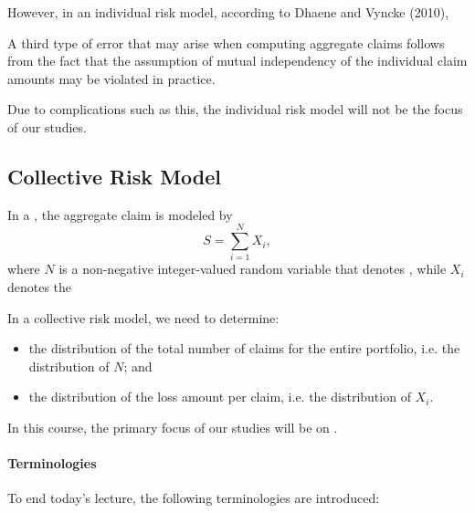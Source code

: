 \documentclass[notoc,notitlepage]{tufte-book}
\begin{document}
However, in an individual risk model, according to Dhaene and Vyncke (2010)\cite{DhaeneVyncke2010},

\begin{displayquote}
  A third type of error that may arise when computing aggregate claims follows from the fact that the assumption of mutual independency of the individual claim amounts may be violated in practice.
\end{displayquote}

Due to complications such as this, the individual risk model will not be the focus of our studies.


\subsection{Collective Risk Model}%
\label{sub:collective_risk_model}

\begin{defn}
\label{defn:collective_risk_model}
  In a , the aggregate claim is modeled by
  \begin{equation*}
    S = \sum_{i=1}^{N} X_i,
  \end{equation*}
  where $N$ is a non-negative integer-valued random variable that denotes , while $X_i$ denotes the 
\end{defn}

\begin{note}
  In a collective risk model, we need to determine:
  \begin{itemize}
    \item the distribution of the total number of claims for the entire portfolio, i.e. the distribution of $N$; and
    \item the distribution of the loss amount per claim, i.e. the distribution of $X_i$.
  \end{itemize}
\end{note}


In this course, the primary focus of our studies will be on .

\paragraph{Terminologies} To end today's lecture, the following terminologies are introduced:
\end{document}
